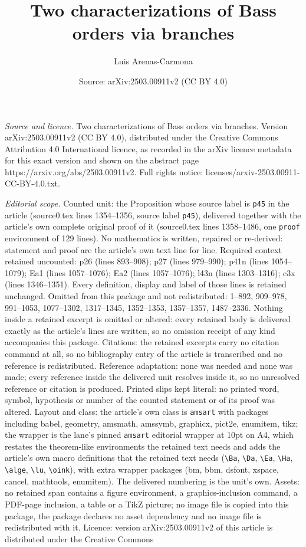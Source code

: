 \documentclass[10pt,a4paper]{amsart}
\title[Two characterizations of Bass orders via branches]{Two characterizations of Bass orders via branches}
\author{Luis Arenas-Carmona}
\date{Source: arXiv:2503.00911v2 (CC BY 4.0)}
\begin{document}
\maketitle

\noindent\emph{Source and licence.} Two characterizations of Bass orders via branches. Version arXiv:2503.00911v2 (CC BY 4.0), distributed under the Creative Commons Attribution 4.0 International licence, as recorded in the arXiv licence metadata for this exact version and shown on the abstract page https://arxiv.org/abs/2503.00911v2. Full rights notice: licenses/arxiv-2503.00911-CC-BY-4.0.txt.\par\smallskip

\noindent\textit{Editorial scope.} Counted unit: the Proposition whose source label is \texttt{p45} in the article (source0.tex lines 1354--1356, source label \texttt{p45}), delivered together with the article's own complete original proof of it (source0.tex lines 1358--1486, one \texttt{proof} environment of 129 lines). No mathematics is written, repaired or re-derived: statement and proof are the article's own text line for line. Required context retained uncounted: p26 (lines 893--908); p27 (lines 979--990); p41n (lines 1054--1079); Ea1 (lines 1057--1076); Ea2 (lines 1057--1076); l43n (lines 1303--1316); c3x (lines 1346--1351). Every definition, display and label of those lines is retained unchanged. Omitted from this package and not redistributed: 1--892, 909--978, 991--1053, 1077--1302, 1317--1345, 1352--1353, 1357--1357, 1487--2336. Nothing inside a retained excerpt is omitted or altered: every retained body is delivered exactly as the article's lines are written, so no omission receipt of any kind accompanies this package. Citations: the retained excerpts carry no citation command at all, so no bibliography entry of the article is transcribed and no reference is redistributed. Reference adaptation: none was needed and none was made; every reference inside the delivered unit resolves inside it, so no unresolved reference or citation is produced. Printed slips kept literal: no printed word, symbol, hypothesis or number of the counted statement or of its proof was altered. Layout and class: the article's own class is \texttt{amsart} with packages including babel, geometry, amsmath, amssymb, graphicx, pict2e, enumitem, tikz; the wrapper is the lane's pinned \texttt{amsart} editorial wrapper at 10pt on A4, which restates the theorem-like environments the retained text needs and adds the article's own macro definitions that the retained text needs (\texttt{\textbackslash Ba}, \texttt{\textbackslash Da}, \texttt{\textbackslash Ea}, \texttt{\textbackslash Ha}, \texttt{\textbackslash alge}, \texttt{\textbackslash lu}, \texttt{\textbackslash oink}), with extra wrapper packages (bm, bbm, dsfont, xspace, cancel, mathtools, enumitem). The delivered numbering is the unit's own. Assets: no retained span contains a figure environment, a graphics-inclusion command, a PDF-page inclusion, a table or a TikZ picture; no image file is copied into this package, the package declares no asset dependency and no image file is redistributed with it. Licence: version arXiv:2503.00911v2 of this article is distributed under the Creative Commons 
\end{document}
